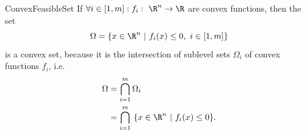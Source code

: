 \begin{ex}{ConvexFeasibleSet}
    If $\forall i \in [1,m]: f_i : \ \R^n \rightarrow \R$ are convex functions, then the set 
    \begin{equation*}
        \Omega = \{x \in \R^n \ | \ f_i(x) \leq 0, \ i \in [1,m]\}
    \end{equation*}
    is a convex set, because it is the intersection of sublevel sets $\Omega_i$ of convex functions $f_i$, i\@.e\@.
    \begin{align*}
        \Omega 
            &= \bigcap_{i=1}^m \Omega_i \\
            &= \bigcap_{i=1}^m \ \{x \in \R^n \ | \ f_i(x) \leq 0 \}.
    \end{align*}
    \vspace{-0.5cm}
\end{ex}

